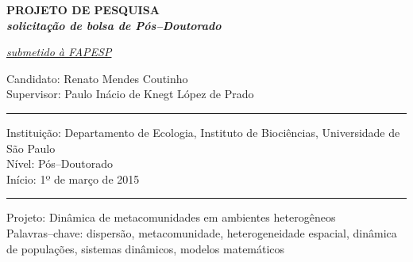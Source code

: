 \documentclass[12pt]{extarticle}
\begin{document}
\thispagestyle{empty}

\begin{center}
    \bf \Large \color{blue} PROJETO DE PESQUISA\\
    {\it \small  solicitação de bolsa de Pós--Doutorado}
\end{center}
\vskip 1.0cm
\hfill {\it \underline{submetido à FAPESP}}
\vskip 2.5cm

\setlength{\parindent}{0pt}
\doublespacing
{\sf \fontsize{13pt}{1.5em}\selectfont
Candidato: Renato Mendes Coutinho\\
Supervisor: Paulo Inácio de Knegt López de Prado\\

{\color{green}\hrule}
\vskip 1cm

Instituição: Departamento de Ecologia, Instituto de Biociências, Universidade de São Paulo\\
Nível: Pós--Doutorado\\
Início: 1º de março de 2015\\

{\color{green}\hrule}
\vskip 1cm

Projeto: Dinâmica de metacomunidades em ambientes heterogêneos\\
Palavras--chave: dispersão, metacomunidade, heterogeneidade espacial, dinâmica
de populações, sistemas dinâmicos, modelos matemáticos
}

\newpage
\end{document}

